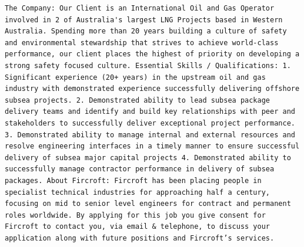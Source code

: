 \documentclass[11pt,a4paper,]{article}
\begin{document}
\begin{verbatim}
The Company: Our Client is an International Oil and Gas Operator involved in 2 of Australia's largest LNG Projects based in Western Australia. Spending more than 20 years building a culture of safety and environmental stewardship that strives to achieve world-class performance, our client places the highest of priority on developing a strong safety focused culture. Essential Skills / Qualifications: 1. Significant experience (20+ years) in the upstream oil and gas industry with demonstrated experience successfully delivering offshore subsea projects. 2. Demonstrated ability to lead subsea package delivery teams and identify and build key relationships with peer and stakeholders to successfully deliver exceptional project performance. 3. Demonstrated ability to manage internal and external resources and resolve engineering interfaces in a timely manner to ensure successful delivery of subsea major capital projects 4. Demonstrated ability to successfully manage contractor performance in delivery of subsea packages. About Fircroft: Fircroft has been placing people in specialist technical industries for approaching half a century, focusing on mid to senior level engineers for contract and permanent roles worldwide. By applying for this job you give consent for Fircroft to contact you, via email & telephone, to discuss your application along with future positions and Fircroft’s services.

\end{verbatim}
\end{document}
